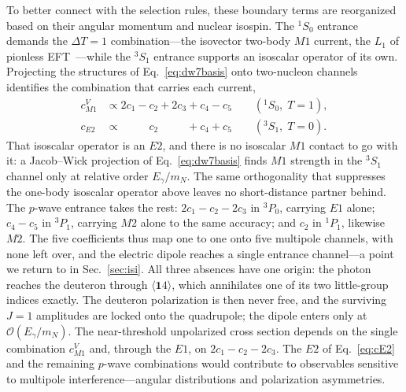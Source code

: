 \documentclass[
  aps,prd,twocolumn,nofootinbib,superscriptaddress,
  longbibliography,floatfix,preprintnumbers
]{revtex4-2}
\newcommand{\Egam}{E_{\gamma}}
\newcommand{\Mone}{M1}
\newcommand{\Eone}{E1}
\newcommand{\Etwo}{E2}
\newcommand{\Mtwo}{M2}
\newcommand{\ad}[2]{\langle #1 #2\rangle}
\begin{document}
To better connect with the selection rules, these boundary terms are reorganized based on their angular momentum and nuclear isospin.
The $^{1}S_{0}$ entrance demands the $\Delta T=1$ combination---the isovector two-body
$\Mone$ current, the $L_{1}$ of pionless EFT~\cite{Chen:1999tn}---while the $^{3}S_{1}$ entrance supports an isoscalar operator of its own. Projecting the structures of
Eq.~\eqref{eq:dw7basis} onto two-nucleon channels identifies the combination that
carries each current,
\begin{align}
  c^{V}_{\Mone} &\propto 2c_{1}-c_{2}+2c_{3}+c_{4}-c_{5}
    \qquad (^{1}S_{0},\;T=1), \label{eq:cM1V}\\
  c_{\Etwo} &\propto \phantom{2c_{1}-{}}c_{2}\phantom{{}+2c_{3}}+c_{4}+c_{5}
    \qquad (^{3}S_{1},\;T=0). \label{eq:cE2}
\end{align}
That isoscalar operator is an $\Etwo$, and there is no isoscalar $\Mone$ contact to
go with it: a Jacob--Wick projection of Eq.~\eqref{eq:dw7basis} finds $\Mone$
strength in the $^{3}S_{1}$ channel only at relative order $\Egam/m_{N}$. The same
orthogonality that suppresses the one-body isoscalar operator above leaves no
short-distance partner behind. The $p$-wave
entrance takes the rest: $2c_{1}-c_{2}-2c_{3}$ in $^{3}P_{0}$, carrying $\Eone$ alone;
$c_{4}-c_{5}$ in $^{3}P_{1}$, carrying $\Mtwo$ alone to the same accuracy; and
$c_{2}$ in $^{1}P_{1}$, likewise $\Mtwo$. The five coefficients thus map one to one
onto five multipole channels, with none left over, and the electric dipole reaches a
single entrance channel---a point we return to in Sec.~\ref{sec:isi}.
All three absences have one origin: the photon reaches the deuteron through
$\ad{\bm{1}}{4}$, which annihilates one of its two little-group indices exactly.
The deuteron polarization is then never free, and the surviving $J=1$ amplitudes
are locked onto the quadrupole; the dipole enters only at
$\mathcal{O}(\Egam/m_{N})$.
The near-threshold unpolarized cross section depends on the single combination $c^{V}_{\Mone}$
and, through the $\Eone$, on $2c_{1}-c_{2}-2c_{3}$.
The $\Etwo$ of Eq.~\eqref{eq:cE2} and the remaining $p$-wave
combinations would contribute to observables sensitive to multipole interference---angular
distributions and polarization asymmetries.
\end{document}
